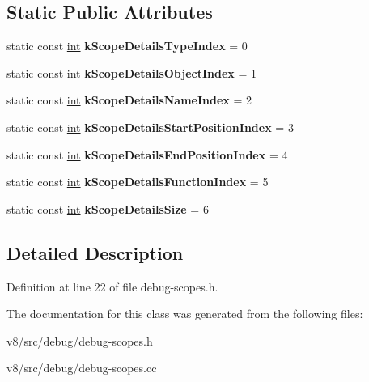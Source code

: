 \subsection*{Static Public Attributes}
\begin{DoxyCompactItemize}
\item 
\mbox{\label{classv8_1_1internal_1_1ScopeIterator_a3e667203bbc187b52d0661caa6339e40}} 
static const \mbox{\hyperlink{classint}{int}} {\bfseries k\+Scope\+Details\+Type\+Index} = 0
\item 
\mbox{\label{classv8_1_1internal_1_1ScopeIterator_ae6a44f9c5bccc8c3b7723aff91799be1}} 
static const \mbox{\hyperlink{classint}{int}} {\bfseries k\+Scope\+Details\+Object\+Index} = 1
\item 
\mbox{\label{classv8_1_1internal_1_1ScopeIterator_a0fa8f4e43705cae688f30273ffed44a7}} 
static const \mbox{\hyperlink{classint}{int}} {\bfseries k\+Scope\+Details\+Name\+Index} = 2
\item 
\mbox{\label{classv8_1_1internal_1_1ScopeIterator_a55df03c1c266defde7f6865e9e77a2c6}} 
static const \mbox{\hyperlink{classint}{int}} {\bfseries k\+Scope\+Details\+Start\+Position\+Index} = 3
\item 
\mbox{\label{classv8_1_1internal_1_1ScopeIterator_aeffdea2c156b25a4b9f6eccd04fa2317}} 
static const \mbox{\hyperlink{classint}{int}} {\bfseries k\+Scope\+Details\+End\+Position\+Index} = 4
\item 
\mbox{\label{classv8_1_1internal_1_1ScopeIterator_adc82682c88345e47935566837511d14d}} 
static const \mbox{\hyperlink{classint}{int}} {\bfseries k\+Scope\+Details\+Function\+Index} = 5
\item 
\mbox{\label{classv8_1_1internal_1_1ScopeIterator_aaccef289782f1fd53edc2dd1d3989681}} 
static const \mbox{\hyperlink{classint}{int}} {\bfseries k\+Scope\+Details\+Size} = 6
\end{DoxyCompactItemize}


\subsection{Detailed Description}


Definition at line 22 of file debug-\/scopes.\+h.



The documentation for this class was generated from the following files\+:\begin{DoxyCompactItemize}
\item 
v8/src/debug/debug-\/scopes.\+h\item 
v8/src/debug/debug-\/scopes.\+cc\end{DoxyCompactItemize}
